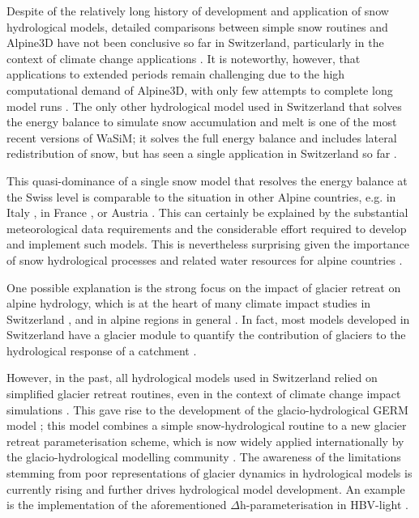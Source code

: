 \documentclass[10pt,a4paper]{article}
\begin{document}
Despite of the relatively long history of development and application of snow hydrological models, detailed comparisons between simple snow routines and Alpine3D have not been conclusive so far in Switzerland, particularly in the context of climate change applications \citep{Kobierska2011, Shakoor2018}. It is noteworthy, however, that applications to extended periods remain challenging due to the high computational demand of Alpine3D, with only few attempts to complete long model runs \citep{Michel2021}. The only other hydrological model used in Switzerland that solves the energy balance to simulate snow accumulation and melt is one of the most recent versions of WaSiM; it solves the full energy balance and includes lateral redistribution of snow, but has seen a single application in Switzerland so far \citep{Thornton2021}. 

This quasi-dominance of a single snow model that resolves the energy balance at the Swiss level is comparable to the situation in other Alpine countries, e.g. in Italy \citep[Geotop;][]{Endrizzi2014}, in France \citep[Crocus;][]{Vionnet2012}, or Austria \citep[Admunsen;][]{Strasser2004}. This can certainly be explained by the substantial meteorological data requirements and the considerable effort required to develop and implement such models. This is nevertheless surprising given the importance of snow hydrological processes and related water resources for alpine countries \citep{Beniston2018}.

One possible explanation is the strong focus on the impact of glacier retreat on alpine hydrology, which is at the heart of many climate impact studies in Switzerland \citep{Horton2006, Schaefli2007b, Junghans2011, Addor2014, Finger2015, Etter2017}, and in alpine regions in general \citep{Huss2017}. In fact, most models developed in Switzerland have a glacier module to quantify the contribution of glaciers to the hydrological response of a catchment \citep[see for example][]{Finger2011, Verbunt2003, Zappa2007a, Uhlmann2013a}. 
 
However, in the past, all hydrological models used in Switzerland relied on simplified glacier retreat routines, even in the context of climate change impact simulations \citep[e.g.][]{Horton2006}. This gave rise to the development of the glacio-hydrological GERM model \citep{Huss2016, Junghans2011, Farinotti2012, Finger2013}; this model combines a simple snow-hydrological routine to a new glacier retreat parameterisation scheme, which is now widely applied internationally by the glacio-hydrological modelling community \citep[][called $\Delta$h-parametrisation]{Huss2010}. The awareness of the limitations stemming from poor representations of glacier dynamics in hydrological models is currently rising and further drives hydrological model development. An example is the implementation of the aforementioned $\Delta$h-parameterisation in HBV-light \citep{Seibert2018}. 
\end{document}
